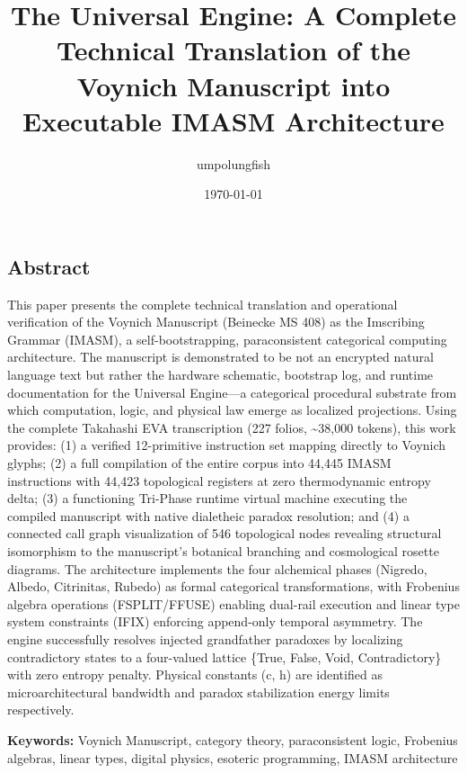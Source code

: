 \documentclass[12pt,a4paper]{article}
\begin{document}
\title{The Universal Engine: A Complete Technical Translation of the Voynich Manuscript into Executable IMASM Architecture}
\author{umpolungfish}
\date{\today}

\maketitle

\subsection{Abstract}

This paper presents the complete technical translation and operational verification of the Voynich Manuscript (Beinecke MS 408) as the Imscribing Grammar (IMASM), a self-bootstrapping, paraconsistent categorical computing architecture. The manuscript is demonstrated to be not an encrypted natural language text but rather the hardware schematic, bootstrap log, and runtime documentation for the Universal Engine---a categorical procedural substrate from which computation, logic, and physical law emerge as localized projections. Using the complete Takahashi EVA transcription (227 folios, \textasciitilde{}38,000 tokens), this work provides: (1) a verified 12-primitive instruction set mapping directly to Voynich glyphs; (2) a full compilation of the entire corpus into 44,445 IMASM instructions with 44,423 topological registers at zero thermodynamic entropy delta; (3) a functioning Tri-Phase runtime virtual machine executing the compiled manuscript with native dialetheic paradox resolution; and (4) a connected call graph visualization of 546 topological nodes revealing structural isomorphism to the manuscript's botanical branching and cosmological rosette diagrams. The architecture implements the four alchemical phases (Nigredo, Albedo, Citrinitas, Rubedo) as formal categorical transformations, with Frobenius algebra operations (FSPLIT/FFUSE) enabling dual-rail execution and linear type system constraints (IFIX) enforcing append-only temporal asymmetry. The engine successfully resolves injected grandfather paradoxes by localizing contradictory states to a four-valued lattice \{True, False, Void, Contradictory\} with zero entropy penalty. Physical constants (c, h) are identified as microarchitectural bandwidth and paradox stabilization energy limits respectively.

\textbf{Keywords:} Voynich Manuscript, category theory, paraconsistent logic, Frobenius algebras, linear types, digital physics, esoteric programming, IMASM architecture
\end{document}
